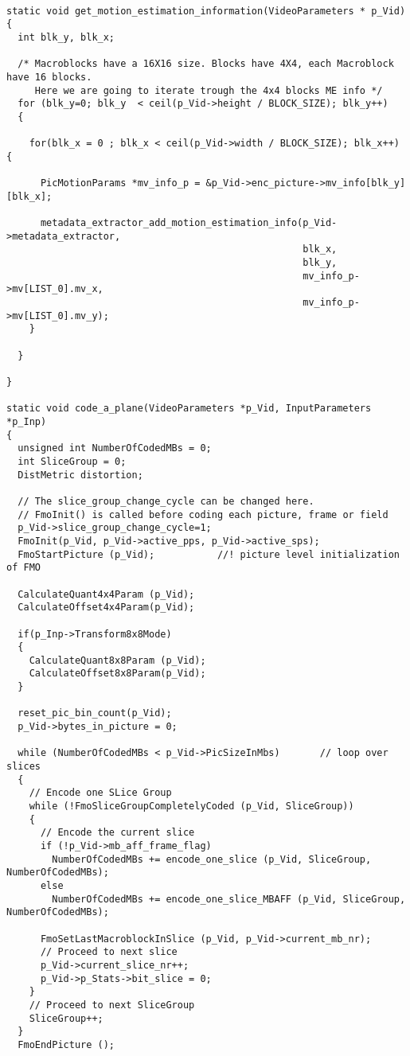 \begin{lstlisting}

static void get_motion_estimation_information(VideoParameters * p_Vid)
{
  int blk_y, blk_x;
  
  /* Macroblocks have a 16X16 size. Blocks have 4X4, each Macroblock have 16 blocks. 
     Here we are going to iterate trough the 4x4 blocks ME info */
  for (blk_y=0; blk_y  < ceil(p_Vid->height / BLOCK_SIZE); blk_y++)
  {

    for(blk_x = 0 ; blk_x < ceil(p_Vid->width / BLOCK_SIZE); blk_x++) {

      PicMotionParams *mv_info_p = &p_Vid->enc_picture->mv_info[blk_y][blk_x];

      metadata_extractor_add_motion_estimation_info(p_Vid->metadata_extractor,
                                                    blk_x,
                                                    blk_y,
                                                    mv_info_p->mv[LIST_0].mv_x,
                                                    mv_info_p->mv[LIST_0].mv_y);
    }

  }

}

static void code_a_plane(VideoParameters *p_Vid, InputParameters *p_Inp)
{
  unsigned int NumberOfCodedMBs = 0;
  int SliceGroup = 0;
  DistMetric distortion; 

  // The slice_group_change_cycle can be changed here.
  // FmoInit() is called before coding each picture, frame or field
  p_Vid->slice_group_change_cycle=1;
  FmoInit(p_Vid, p_Vid->active_pps, p_Vid->active_sps);
  FmoStartPicture (p_Vid);           //! picture level initialization of FMO

  CalculateQuant4x4Param (p_Vid);
  CalculateOffset4x4Param(p_Vid);

  if(p_Inp->Transform8x8Mode)
  {
    CalculateQuant8x8Param (p_Vid);
    CalculateOffset8x8Param(p_Vid);
  }

  reset_pic_bin_count(p_Vid);
  p_Vid->bytes_in_picture = 0;

  while (NumberOfCodedMBs < p_Vid->PicSizeInMbs)       // loop over slices
  {
    // Encode one SLice Group
    while (!FmoSliceGroupCompletelyCoded (p_Vid, SliceGroup))
    {
      // Encode the current slice
      if (!p_Vid->mb_aff_frame_flag)
        NumberOfCodedMBs += encode_one_slice (p_Vid, SliceGroup, NumberOfCodedMBs);
      else
        NumberOfCodedMBs += encode_one_slice_MBAFF (p_Vid, SliceGroup, NumberOfCodedMBs);

      FmoSetLastMacroblockInSlice (p_Vid, p_Vid->current_mb_nr);
      // Proceed to next slice
      p_Vid->current_slice_nr++;
      p_Vid->p_Stats->bit_slice = 0;
    }
    // Proceed to next SliceGroup
    SliceGroup++;
  }
  FmoEndPicture ();


\end{lstlisting}
